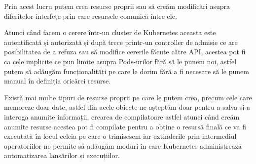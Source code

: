 Prin acest lucru putem crea resurse proprii sau să creăm modificări asupra diferitelor 
interfețe prin care resursele comunică între ele.

Atunci când facem o cerere într-un cluster de Kubernetes aceasta este autentificată și autorizată 
și după trece printr-un controller de admisie ce are posibilitatea de a refuza sau să modifice
cererile făcute către API, acestea pot fi ca cele implicite ce pun limite asupra Pods-urilor
fără să le punem noi, astfel putem să adăugăm funcționalități pe care le dorim fără 
a fi necesare să le punem manual în definiția oricărei resurse.

Există mai multe tipuri de resurse proprii pe care le putem crea, precum cele care 
memoreze doar date, astfel din acele obiecte ne așteptăm doar pentru a salva și a interoga anumite
informații, crearea de compilatoare astfel atunci când creăm anumite resurse acestea pot fi compilate 
pentru a obține o resursă finală ce va fi executată în locul celeia pe care o trimisesem iar 
extinderile prin intermediul operatoriilor ne permite să adăugăm moduri în care Kubernetes 
administrează automatizarea lansărilor și execuțiilor.
